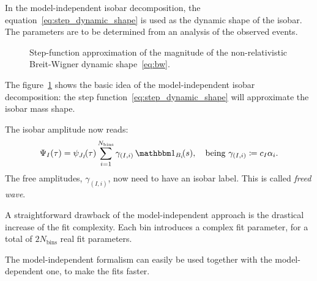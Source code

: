     In the model-independent isobar decomposition, the equation~\eqref{eq:step_dynamic_shape} is used as the dynamic shape of the isobar.
    The parameters are to be determined from an analysis of the observed events.
    \begin{figure}
        \centering
        \caption{Step-function approximation of the magnitude of the non-relativistic Breit-Wigner dynamic shape~\eqref{eq:bw}.}
        \label{fig:step_function_approximation}
    \end{figure}
    The figure~\ref{fig:step_function_approximation} shows the basic idea of the model-independent isobar decomposition: the step function~\eqref{eq:step_dynamic_shape} will approximate the isobar mass shape.


    The isobar amplitude now reads:
    \begin{equation}
        \Psi_I(\tau) = \psi_{J_I}\!(\tau) \sum_{i=1}^{N_\text{bins}} \gamma_{(I,i)}\, \Characteristic_{B_i}\!(s),
        \quad
        \text{being }
        \gamma_{(I,i)} \coloneqq c_I \alpha_i. 
    \end{equation}
    The free amplitudes, $\gamma_{(I,i)}$, now need to have an isobar label.
    This is called \emph{freed wave}.


    A straightforward drawback of the model-independent approach is the drastical increase of the fit complexity.
    Each bin introduces a complex fit parameter, for a total of $2N_{\text{bins}}$ real fit parameters.


    The model-independent formalism can easily be used together with the model-dependent one, to make the fits faster.

